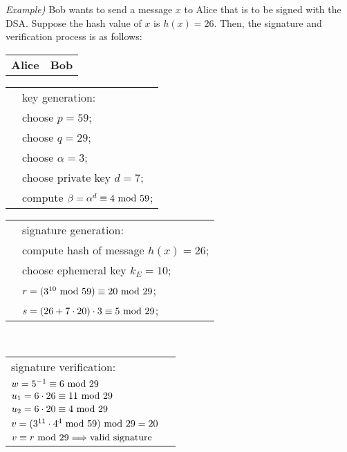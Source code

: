 \newpage
\hfill\break
\textit{Example)} Bob wants to send a message $x$ to Alice that is to be signed with the DSA. Suppose the hash value of $x$ is $h(x)=26$. Then, the signature and verification process is as follows:
\begin{center}
\begin{framed}
    \begin{tabular}{c@{\hskip 10cm}c}
        \textbf{Alice}&\textbf{Bob}
    \end{tabular}
    \begin{tabular}{l@{\hskip 10cm}l}
        &key generation:\\
        &choose $p=59$;\\
        &choose $q=29$;\\
        &choose $\alpha=3$;\\
        &choose private key $d=7$;\\
        &compute $\beta=\alpha^d\equiv4\text{ mod }59$;
    \end{tabular}
    \begin{tabular}{l@{\hskip 11cm}l}
        &signature generation:\\
        &compute hash of message $h(x)=26$;\\
        &choose ephemeral key $k_E=10$;\\
        &$r=(3^{10}\text{ mod }59)\equiv20\text{ mod }29$;\\
        &$s=(26+7\cdot20)\cdot3\equiv5\text{ mod }29$;
    \end{tabular}
    \\
    \begin{tabular}{l@{\hskip 11cm}l}
        signature verification:&\\
        $w=5^{-1}\equiv6\text{ mod }29$&\\
        $u_1=6\cdot26\equiv11\text{ mod }29$&\\
        $u_2=6\cdot20\equiv4\text{ mod }29$&\\
        $v=(3^{11}\cdot4^4\text{ mod }59)\text{ mod }29=20$&\\
        $v\equiv r\text{ mod }29\Longrightarrow\text{valid signature}$&
    \end{tabular}
\end{framed}
\end{center}

